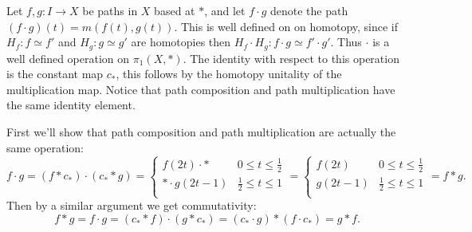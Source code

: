 \documentclass[11pt,letterpaper]{article}
\begin{document}
\begin{solution}
    \quad Let $f,g : I \to X$ be paths in $X$ based at $*$, and let $f\cdot g$ denote the path $(f\cdot g)(t) = m(f(t), g(t))$. This is well defined on on homotopy, since if $H_f : f\simeq f'$ and $H_g : g\simeq g'$ are homotopies then $H_f\cdot H_g : f\cdot g \simeq f'\cdot g'$. Thus $\cdot$ is a well defined operation on $\pi_1(X,*)$. The identity with respect to this operation is the constant map $c_*$, this follows by the homotopy unitality of the multiplication map. Notice that path composition and path multiplication have the same identity element.

    \quad First we'll show that path composition and path multiplication are actually the same operation:
    \[
        f\cdot g = (f * c_*) \cdot (c_* * g) = \begin{cases}
            f(2t)\cdot * & 0\leq t\leq \frac{1}{2}\\
            * \cdot g(2t-1) & \frac{1}{2}\leq t\leq 1\\
        \end{cases} = \begin{cases}
            f(2t) & 0\leq t\leq \frac{1}{2}\\
            g(2t-1) & \frac{1}{2}\leq t\leq 1\\
        \end{cases} = f * g
    .\] 
    Then by a similar argument we get commutativity:
    \[
        f * g = f\cdot g = (c_* * f)\cdot (g * c_*) = (c_* \cdot g) * (f \cdot c_*) = g * f
    .\]
\end{solution}
\end{document}
